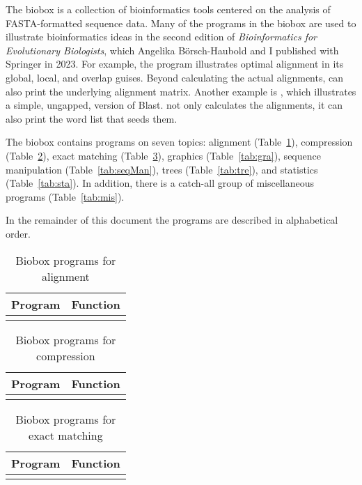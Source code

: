 The biobox is a collection of bioinformatics tools centered on the
analysis of FASTA-formatted sequence data. Many of the programs in the
biobox are used to illustrate bioinformatics ideas in the second
edition of \emph{Bioinformatics for Evolutionary Biologists}, which
Angelika Börsch-Haubold and I published with Springer in 2023. For
example, the program  illustrates optimal alignment in its
global, local, and overlap guises. Beyond calculating the actual
alignments,  can also print the underlying alignment
matrix. Another example is , which illustrates a simple,
ungapped, version of Blast.  not only calculates the
alignments, it can also print the word list that seeds them.

The biobox contains programs on seven topics: alignment
(Table~\ref{tab:ali}), compression (Table~\ref{tab:com}), exact
matching (Table~\ref{tab:exa}), graphics (Table~\ref{tab:gra}),
sequence manipulation (Table~\ref{tab:seqMan}), trees
(Table~\ref{tab:tre}), and statistics (Table~\ref{tab:sta}). In
addition, there is a catch-all group of miscellaneous programs
(Table~\ref{tab:mis}).

In the remainder of this document the programs are described in
alphabetical order.

\begin{table}
  \caption{Biobox programs for alignment}\label{tab:ali}
  \begin{center}
    \begin{tabular}{ll}
      \hline
      Program & Function\\\hline
      \\
      \hline
    \end{tabular}
  \end{center}
\end{table}

\begin{table}
  \caption{Biobox programs for compression}\label{tab:com}
  \begin{center}
    \begin{tabular}{ll}
    \hline
    Program & Function\\\hline
      \\
      \hline
    \end{tabular}
  \end{center}
\end{table}

\begin{table}
  \caption{Biobox programs for exact matching}\label{tab:exa}
  \begin{center}
    \begin{tabular}{ll}
      \hline
      Program & Function\\\hline
      \\
      \hline
    \end{tabular}
  \end{center}
\end{table}

